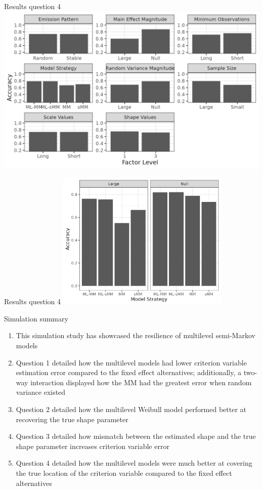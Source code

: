 \documentclass[
  ignorenonframetext,
]{beamer}
\begin{document}
\begin{frame}{Results question 4}
\label{results-question-4-1}
\includegraphics{figures/glm1MainEffect.png}
\end{frame}

\begin{frame}{Results question 4}
\label{results-question-4-2}
\includegraphics[width=\textwidth,height=2.60417in]{figures/glm1TwoWay1.png}
\end{frame}

\begin{frame}{Simulation summary}
\label{simulation-summary}
\begin{enumerate}
\item
  This simulation study has showcased the resilience of multilevel
  semi-Markov models
\item
  Question 1 detailed how the multilevel models had lower criterion
  variable estimation error compared to the fixed effect alternatives;
  additionally, a two-way interaction displayed how the MM had the
  greatest error when random variance existed
\item
  Question 2 detailed how the multilevel Weibull model performed better
  at recovering the true shape parameter
\item
  Question 3 detailed how mismatch between the estimated shape and the
  true shape parameter increases criterion variable error
\item
  Question 4 detailed how the multilevel models were much better at
  covering the true location of the criterion variable compared to the
  fixed effect alternatives
\end{enumerate}
\end{frame}
\end{document}
